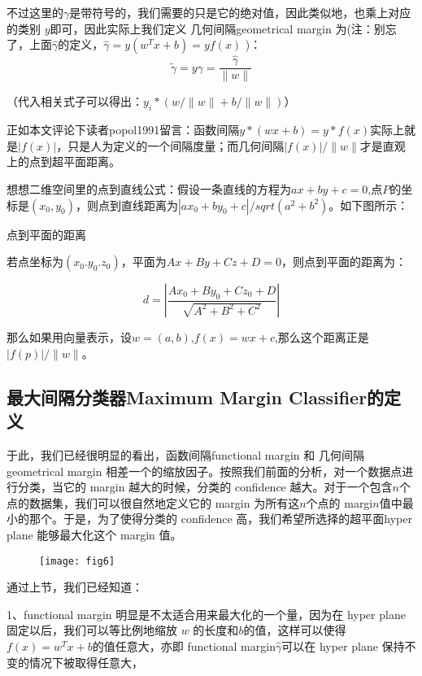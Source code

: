 \documentclass[a4paper,12pt]{article}
\begin{document}
不过这里的$\gamma$是带符号的，我们需要的只是它的绝对值，因此类似地，也乘上对应的类别 $y$即可，因此实际上我们定义 几何间隔geometrical margin 为(注：别忘了，上面$\widehat{\gamma}$的定义，$\widehat{\gamma}=y(w^Tx+b)=yf(x)$ )：
\begin{equation}
  \widetilde{\gamma}=y\gamma=\frac{\widehat{\gamma}}{\|w\|}
\end{equation}
\begin{center}
（代入相关式子可以得出：$y_i*(w/\|w\| + b/\|w\|)$）
\end{center}

正如本文评论下读者popol1991留言：函数间隔$y*(wx+b)=y*f(x)$实际上就是$|f(x)|$，只是人为定义的一个间隔度量；而几何间隔$|f(x)|/\|w\|$才是直观上的点到超平面距离。

想想二维空间里的点到直线公式：假设一条直线的方程为$ax+by+c=0$,点$P$的坐标是$(x_0,y_0)$，则点到直线距离为$|ax_0+by_0+c|/sqrt(a^2+b^2)$。如下图所示：

点到平面的距离

若点坐标为$(x_0.y_0.z_0)$，平面为$Ax+By+Cz+D=0$，则点到平面的距离为：

\begin{equation}
  d=\left|\frac{Ax_0+By_0+Cz_0+D}{\sqrt{A^2+B^2+C^2}}\right|
\end{equation}

那么如果用向量表示，设$w=(a,b)$,$f(x)=wx+c$,那么这个距离正是$|f(p)|/\|w\|$。

\subsection{最大间隔分类器Maximum Margin Classifier的定义}

于此，我们已经很明显的看出，函数间隔functional margin 和 几何间隔geometrical margin 相差一个的缩放因子。按照我们前面的分析，对一个数据点进行分类，当它的 margin 越大的时候，分类的 confidence 越大。对于一个包含$ n $个点的数据集，我们可以很自然地定义它的 margin 为所有这$ n $个点的 margi$n $值中最小的那个。于是，为了使得分类的 confidence 高，我们希望所选择的超平面hyper plane 能够最大化这个 margin 值。

\begin{figure}[H]
  \centering
  \texttt{[image: fig6]}
\end{figure}
通过上节，我们已经知道：

1、functional margin 明显是不太适合用来最大化的一个量，因为在 hyper plane 固定以后，我们可以等比例地缩放 $w$ 的长度和$ b $的值，这样可以使得$f(x)=w^Tx+b$的值任意大，亦即 functional margin$\widehat{\gamma}$可以在 hyper plane 保持不变的情况下被取得任意大，
\end{document}
